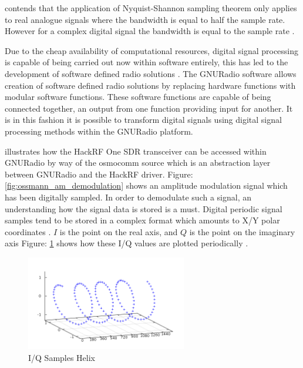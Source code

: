 \documentclass[runningheads,a4paper]{llncs}
\begin{document}
\cite{ossmann-15-b} contends that the application of Nyquist-Shannon sampling theorem only applies to real analogue signals where the bandwidth is equal to half the sample rate. However for a complex digital signal  the bandwidth is equal to the sample rate \citep{ossmann-15-b}.

Due to the cheap availability of computational resources, digital signal processing is capable of being carried out now within software entirely, this has led to the development of software defined radio solutions \citep{freidt-13}. The GNURadio software allows creation of software defined radio solutions by replacing hardware functions with modular software functions. These software functions are capable of being connected together, an output from one function providing input for another. It is in this fashion it is possible to transform digital signals using digital signal processing methods within the GNURadio platform\citep{gnuradio-14}.

\cite{ossmann-15-a} illustrates how the HackRF One \gls{SDR} transceiver can be accessed within GNURadio by way of the osmocomm source which is an abstraction layer between GNURadio and the HackRF driver. Figure: \ref{fig:ossmann_am_demodulation} shows an amplitude modulation signal which has been digitally sampled. In order to demodulate such a signal, an understanding how the signal data is stored is a must. Digital periodic signal samples tend to be stored in a complex format which amounts to X/Y polar coordinates \citep{ossmann-15-c}. $I$ is the point on the real axis, and $Q$ is the point on the imaginary axis Figure: \ref{fig:kuisma-iq-helix} shows how these I/Q values are plotted periodically \citep{kuisma-14}.

%
\begin{figure}[here]
\centering
\includegraphics[width=7cm]{images/48}
\caption{I/Q Samples Helix \citep{kuisma-14}}
\label{fig:kuisma-iq-helix}
\end{figure}
%
\end{document}
